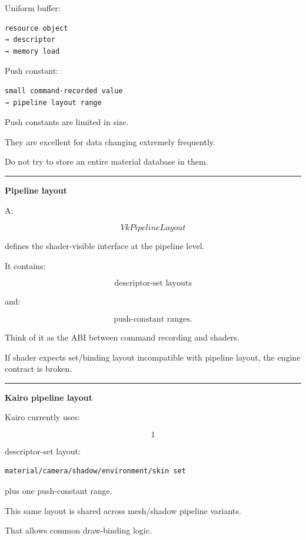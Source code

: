 Uniform buffer:

\begin{verbatim}
resource object
→ descriptor
→ memory load
\end{verbatim}

Push constant:

\begin{verbatim}
small command-recorded value
→ pipeline layout range
\end{verbatim}

Push constants are limited in size.

They are excellent for data changing extremely frequently.

Do not try to store an entire material database in them.

\begin{center}\rule{0.5\linewidth}{0.5pt}\end{center}

\textbf{Pipeline layout}

A:

\[
VkPipelineLayout
\]

defines the shader-visible interface at the pipeline level.

It contains:

\[
\text{descriptor-set layouts}
\]

and:

\[
\text{push-constant ranges}.
\]

Think of it as the ABI between command recording and shaders.

If shader expects set/binding layout incompatible with pipeline layout, the engine contract is broken.

\begin{center}\rule{0.5\linewidth}{0.5pt}\end{center}

\textbf{Kairo pipeline layout}

Kairo currently uses:

\[
1
\]

descriptor-set layout:

\begin{verbatim}
material/camera/shadow/environment/skin set
\end{verbatim}

plus one push-constant range.

This same layout is shared across mesh/shadow pipeline variants.

That allows common draw-binding logic.

